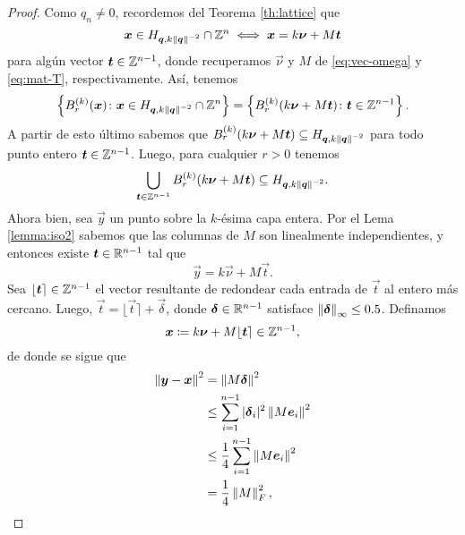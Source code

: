 \begin{proof}
	Como $q_n \neq 0$, recordemos del Teorema \eqref{th:lattice} que
	\begin{equation*}
		\boldsymbol{x} \in H_{\boldsymbol{q}, k\left\lVert \boldsymbol{q} \right\rVert^{-2}} \cap \mathbb{Z}^n \iff \boldsymbol{x} = k\boldsymbol{\nu} + M\boldsymbol{t}
	\end{equation*}
	para algún vector $\boldsymbol{t} \in \mathbb{Z}^{n-1}$, donde recuperamos $\vec{\nu}$ y $M$ de
	\eqref{eq:vec-omega} y \eqref{eq:mat-T}, respectivamente. Así, tenemos
	\begin{equation*}
		\left\lbrace B_r^{(k)}(\boldsymbol{x}) \colon \boldsymbol{x} \in H_{\boldsymbol{q}, k\left\lVert \boldsymbol{q} \right\rVert^{-2}} \cap
			\mathbb{Z}^n \right\rbrace
			=
		\left\lbrace B_r^{(k)}(k\boldsymbol{\nu} + M\boldsymbol{t}) \colon \boldsymbol{t} \in \mathbb{Z}^{n-1} \right\rbrace.
	\end{equation*}
	A partir de esto último sabemos que $B_r^{(k)}(k\boldsymbol{\nu} + M\boldsymbol{t}) \subseteq H_{\boldsymbol{q},
	k\left\lVert \boldsymbol{q} \right\rVert^{-2}}$ para todo punto entero $\boldsymbol{t} \in \mathbb{Z}^{n-1}$. Luego, para cualquier $r >
	0$ tenemos
	\begin{equation}
		\label{eq:ball-cover:1}
		\bigcup_{\boldsymbol{t} \in \mathbb{Z}^{n-1}}B_r^{(k)}(k\boldsymbol{\nu} + M\boldsymbol{t}) \subseteq
		H_{\boldsymbol{q}, k\left\lVert \boldsymbol{q} \right\rVert^{-2}}.
	\end{equation}
	Ahora bien, sea $\vec{y}$ un punto sobre la $k$-ésima capa entera. Por el Lema \ref{lemma:iso2}
	sabemos que las columnas de $M$ son linealmente independientes, y entonces existe $\boldsymbol{t} \in
	\mathbb{R}^{n-1}$ tal que
	\begin{equation*}
		\vec{y} = k\vec{\nu} + M\vec{t}.
	\end{equation*}
	Sea $\lfloor \boldsymbol{t} \rceil \in \mathbb{Z}^{n-1}$ el vector resultante de redondear cada entrada de
	$\vec{t}$ al entero más cercano. Luego, $\vec{t} = \lfloor \vec{t} \rceil + \vec{\delta}$,
	donde $\boldsymbol{\delta} \in \mathbb{R}^{n-1}$ satisface $\left\lVert \boldsymbol{\delta} \right\rVert_{\infty} \leq 0.5$. Definamos
	\begin{equation*}
		\boldsymbol{x} \coloneq k\boldsymbol{\nu} + M\lfloor \boldsymbol{t} \rceil \in \mathbb{Z}^{n-1},
	\end{equation*}
	de donde se sigue que
	\begin{align}
		\left\lVert \boldsymbol{y} - \boldsymbol{x} \right\rVert^{2} 
		&= \left\lVert M\boldsymbol{\delta} \right\rVert^{2} \nonumber \\
		&\leq \sum_{i=1}^{n-1}|\boldsymbol{\delta}_i|^2 \left\lVert M\boldsymbol{e}_i \right\rVert^{2} \nonumber \\
		&\leq \frac{1}{4}\sum_{i=1}^{n-1} \left\lVert M\boldsymbol{e}_i \right\rVert^{2} \label{eq:alt-M-bound} \\
		&= \frac{1}{4}\left\lVert M \right\rVert_F^2, \nonumber
	\end{align}

\end{proof}
